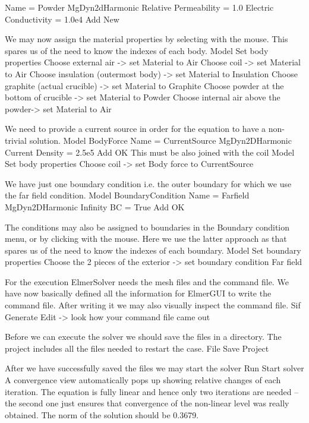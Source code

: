     Name = Powder
    MgDyn2dHarmonic
      Relative Permeability = 1.0
      Electric Conductivity = 1.0e4
    Add
    New
\ttend

We may now assign the material properties by selecting with the mouse.
This spares us of the need to know the indexes of each body.
\ttbegin
Model
  Set body properties
    Choose external air -> set Material to Air
    Choose coil -> set Material to Air
    Choose insulation (outermost body) -> set Material to Insulation
    Choose graphite (actual crucible) -> set Material to Graphite
    Choose powder at the bottom of crucible -> set Material to Powder
    Choose internal air above the powder-> set Material to Air
\ttend

We need to provide a current source in order for the equation to have a non-trivial solution.
\ttbegin
Model
  BodyForce
    Name = CurrentSource
    MgDyn2DHarmonic
      Current Density = 2.5e5
    Add
    OK
\ttend   
This must be also joined with the coil
\ttbegin
Model
  Set body properties
    Choose coil -> set Body force to CurrentSource
\ttend


We have just one boundary condition i.e. the outer boundary for which we use the far field condition.
\ttbegin
Model
  BoundaryCondition
    Name = Farfield
    MgDyn2DHarmonic
      Infinity BC = True
    Add
    OK
\ttend   

The conditions may also be assigned to boundaries in the Boundary condition menu, or 
by clicking with the mouse. Here we use the latter approach as that spares us of the 
need to know the indexes of each boundary.
\ttbegin
Model
  Set boundary properties
    Choose the 2 pieces of the exterior -> set boundary condition Far field
\ttend

For the execution 
ElmerSolver needs the mesh files and the command file. We have now basically defined
all the information for ElmerGUI to write the command file. After writing it we may also visually 
inspect the command file.
\ttbegin
Sif 
  Generate
  Edit -> look how your command file came out  
\ttend

Before we can execute the solver we should save the files in a directory. The project includes
all the files needed to restart the case.
\ttbegin
File 
  Save Project
\ttend

After we have successfully saved the files we may start the solver
\ttbegin
Run
  Start solver
\ttend
A convergence view automatically pops up showing relative changes of each iteration.
The equation is fully linear and hence only two iterations are needed -- the second 
one just ensures that convergence of the non-linear level was really obtained. 
The norm of the solution should be 0.3679.



